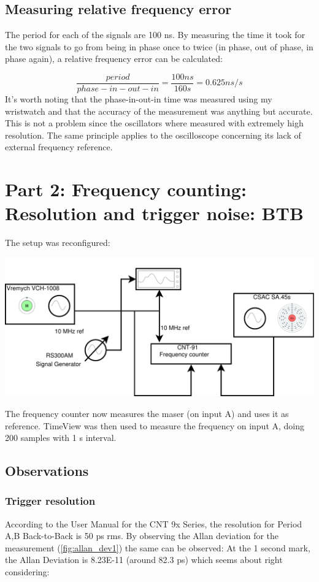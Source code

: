 \documentclass[11pt,english,a4paper]{article}
\begin{document}
\subsection{Measuring relative frequency error}
The period for each of the signals are 100 ns. By measuring the time it took for the two signals to go from being in phase once to twice (in phase, out of phase, in phase again), a relative frequency error can be calculated:

\begin{displaymath}
\frac{period}{phase-in-out-in} = \frac{100 ns}{160 s} = 0.625 ns/s
\end{displaymath}
\newline
It's worth noting that the phase-in-out-in time was measured using my wristwatch and that the accuracy of the measurement was anything but accurate. This is not a problem since the oscillators where measured with extremely high resolution.
The same principle applies to the oscilloscope concerning its lack of external frequency reference.   
\newpage

\section{Part 2: Frequency counting: Resolution and trigger noise: BTB}
The setup was reconfigured:
\begin{center}
\includegraphics[width=1 \textwidth]{lab_report_diagram_del2.pdf}
\end{center}
The frequency counter now measures the maser (on input A) and uses it as reference. TimeView was then used to measure the frequency on input A, doing 200 samples with 1 s interval.

\subsection{Observations}
\subsubsection{Trigger resolution}
According to the User Manual for the CNT 9x Series, the resolution for Period A,B Back-to-Back is 50 ps rms. By observing the Allan deviation for the measurement (\ref{fig:allan_dev1}) the same can be observed: At the 1 second mark, the Allan Deviation is 8.23E-11 (around 82.3 ps) which seems about right considering:
\end{document}
